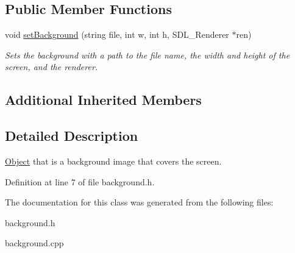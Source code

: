 \subsection*{Public Member Functions}
\begin{DoxyCompactItemize}
\item 
void \hyperlink{classBackground_ae0b55ad792ad37c5d7c200c47ff09859}{set\+Background} (string file, int w, int h, S\+D\+L\+\_\+\+Renderer $\ast$ren)\hypertarget{classBackground_ae0b55ad792ad37c5d7c200c47ff09859}{}\label{classBackground_ae0b55ad792ad37c5d7c200c47ff09859}

\begin{DoxyCompactList}\small\item\em Sets the background with a path to the file name, the width and height of the screen, and the renderer. \end{DoxyCompactList}\end{DoxyCompactItemize}
\subsection*{Additional Inherited Members}


\subsection{Detailed Description}
\hyperlink{classObject}{Object} that is a background image that covers the screen. 

Definition at line 7 of file background.\+h.



The documentation for this class was generated from the following files\+:\begin{DoxyCompactItemize}
\item 
background.\+h\item 
background.\+cpp\end{DoxyCompactItemize}
